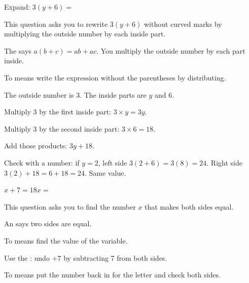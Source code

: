 


Expand: $3(y + 6) = $\ansblank


This question asks you to rewrite $3(y + 6)$ without curved marks by multiplying
the outside number by each inside part.

\begin{words}
  \item The says $a(b + c) = ab + ac$. You multiply
        the outside number by each part inside.
  \item To means write the expression without the parentheses by
        distributing.
\end{words}

\begin{steps}
  \item The outside number is 3. The inside parts are $y$ and 6.
  \item Multiply 3 by the first inside part: $3 \times y = 3y$.
  \item Multiply 3 by the second inside part: $3 \times 6 = 18$.
  \item Add those products: $3y + 18$.
\end{steps}


Check with a number: if $y = 2$, left side $3(2 + 6) = 3(8) = 24$. Right side
$3(2) + 18 = 6 + 18 = 24$. Same value.



$x + 7 = 18$\qquad $x = $\ansblank


This question asks you to find the number $x$ that makes both sides equal.

\begin{words}
  \item An says two sides are equal.
  \item To means find the value of the variable.
  \item Use the : undo $+7$ by subtracting 7 from both sides.
  \item To means put the number back in for the letter and check
        both sides.
\end{words}

